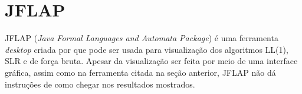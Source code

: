 \begin{figure}[ht]
    \captionsetup{width=16cm}
\end{figure}
\FloatBarrier

\section{JFLAP}
JFLAP (\textit{Java Formal Languages and Automata Package}) é uma ferramenta \textit{desktop} criada por \textcite{jflap} que pode ser usada para visualização dos algoritmos LL(1), SLR e de força bruta. Apesar da visualização ser feita por meio de uma interface gráfica, assim como na ferramenta citada na seção anterior, JFLAP não dá instruções de como chegar nos resultados mostrados.

